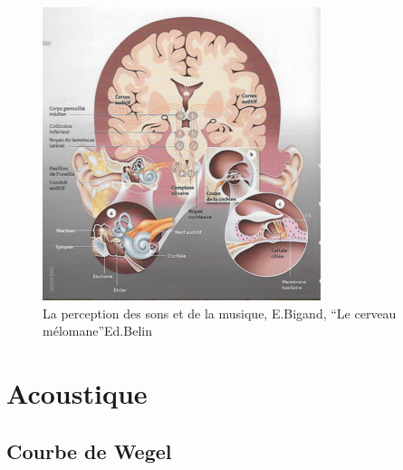         \begin{figure}
	\centering
	\includegraphics[width=1\linewidth]{images/schemacerveauoreillebigand.png}
	\caption[Schéma du déroulement]{La perception des sons et de
          la musique, E.Bigand, ``Le cerveau mélomane''Ed.Belin}
       
	\label{cerveauoreillebigand1}
\end{figure}

\section{Acoustique}

\subsection{Courbe de Wegel}
\label{acoustique}

